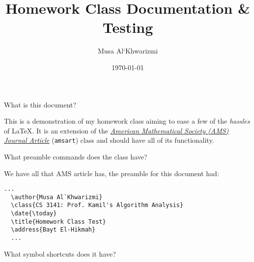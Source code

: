 \documentclass{homework}
\author{Musa Al`Khwarizmi}
\date{\today}
\title{\LaTeXe{} Homework Class Documentation \& Testing}
\begin{document}
 \maketitle

\question What is this document?

This is a demonstration of my homework class aiming to ease a few of the \textit{hassles} of \LaTeX{}. It is an extension of the \href{https://ctan.org/pkg/amsart}{\textit{American Mathematical Society (AMS) Journal Article}} (\texttt{amsart}) class and should have all of its functionality.

\question What preamble commands does the class have?

We have all that AMS article has, the preamble for this document had:
\begin{lstlisting}[language={[LaTeX]TeX}]
  ...
  \author{Musa Al`Khwarizmi}
  \class{CS 3141: Prof. Kamil's Algorithm Analysis}
  \date{\today}
  \title{Homework Class Test}
  \address{Bayt El-Hikmah}
  ...
\end{lstlisting}

\question What symbol shortcuts does it have?
\end{document}
